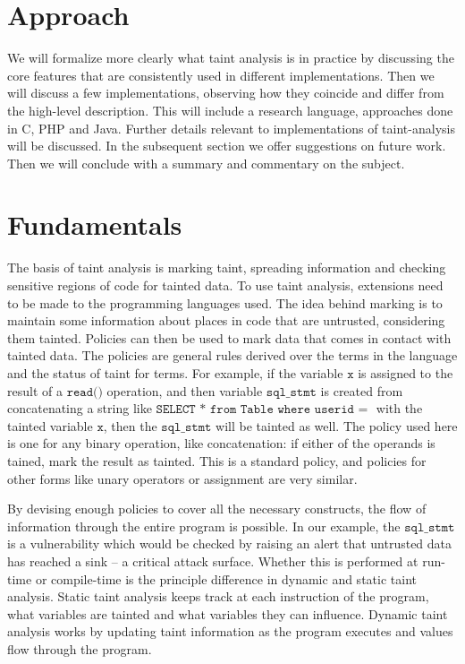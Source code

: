 \documentclass[11pt]{article}
\begin{document}
\section*{Approach}
We will formalize more clearly what taint analysis is in practice by discussing
the core features that are consistently used in different implementations. 
Then we will discuss a few implementations, observing how they coincide and differ
from the high-level description. This will include a research language, approaches
done in C, PHP and Java. Further details relevant to implementations of taint-analysis
will be discussed. In the subsequent section we offer suggestions on future work.
Then we will conclude with a summary and commentary on the subject.


\section*{Fundamentals}
The basis of taint analysis is marking taint, spreading information and checking sensitive
regions of code for tainted data. To use taint analysis, extensions need to be made
to the programming languages used.
The idea behind marking is to maintain some information about places in code 
that are untrusted, considering them tainted. 
Policies can then be used to mark data that comes in contact with tainted data. 
The policies are general rules derived over the terms in the language 
and the status of taint for terms. 
For example, if the variable $\texttt{x}$ is assigned to the result of a 
$\texttt{read()}$ operation, and then variable $\texttt{sql\_stmt}$ is 
created from concatenating a string like 
$\texttt{SELECT * from Table where userid = }$ with the tainted variable $\texttt{x}$,
then the $\texttt{sql\_stmt}$ will be tainted as well. The policy used here is one for 
any binary operation, like concatenation: if either of the operands is tained, mark
the result as tainted. This is a standard policy, and policies for other forms
like unary operators or assignment are very similar. 

By devising enough policies to cover
all the necessary constructs, the flow of information through the entire program
is possible.  In our example, the $\texttt{sql\_stmt}$ is a vulnerability which would 
be checked by raising an alert that untrusted data has reached a sink -- a critical
attack surface.
Whether this is performed at run-time or compile-time is the principle difference 
in dynamic and static taint analysis.  Static taint analysis
keeps track at each instruction of the program, what variables are tainted and 
what variables they can influence. Dynamic taint analysis works by updating taint
information as the program executes and values flow through the program.
\end{document}
